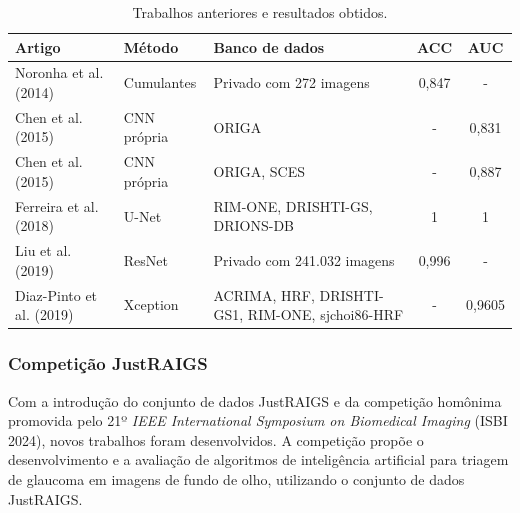 \documentclass[12pt]{article}
\begin{document}
\begin{table}[htb]
    \centering
    \small
    \renewcommand{\arraystretch}{1.2}
    \begin{tabularx}{\textwidth}{>{\raggedright\arraybackslash}p{3cm}l>{\raggedright\arraybackslash}Xcc}
    \toprule
    \textbf{Artigo} & \textbf{Método} & \textbf{Banco de dados} & \textbf{ACC} & \textbf{AUC} \\
    \midrule
    Noronha et al. (2014)~\cite{noronha2014hoc} & Cumulantes  & Privado com 272 imagens        & 0,847 &  -    \\

    Chen et al. (2015)~\cite{chen2015cnn}       & CNN própria & ORIGA                          & -     & 0,831 \\

    Chen et al. (2015)~\cite{chen2015cnn}       & CNN própria & ORIGA, SCES                    & -     & 0,887 \\

    Ferreira et al. (2018)~\cite{ferreira_cnn_2018} & U-Net   & RIM-ONE, DRISHTI-GS, DRIONS-DB & 1     & 1     \\

    Liu et al. (2019)~\cite{liu_cnn_2019}       & ResNet      & Privado com 241.032 imagens    & 0,996 & -     \\

    Diaz-Pinto et al. (2019)~\cite{diaz-pinto2019cnns} & Xception & ACRIMA, HRF, DRISHTI-GS1, RIM-ONE, sjchoi86-HRF & - & 0,9605 \\

    \bottomrule
    \end{tabularx}
    \renewcommand{\arraystretch}{1}
    \caption{Trabalhos anteriores e resultados obtidos.}
    \label{tab:trabalhos}
\end{table}


\subsubsection{Competição JustRAIGS}
\label{sec:review:related:justraigs}

Com a introdução do conjunto de dados JustRAIGS e da competição homônima promovida pelo 21º \textit{IEEE International Symposium on Biomedical Imaging} (ISBI 2024), novos trabalhos foram desenvolvidos. A competição propõe o desenvolvimento e a avaliação de algoritmos de inteligência artificial para triagem de glaucoma em imagens de fundo de olho, utilizando o conjunto de dados JustRAIGS.
\end{document}
